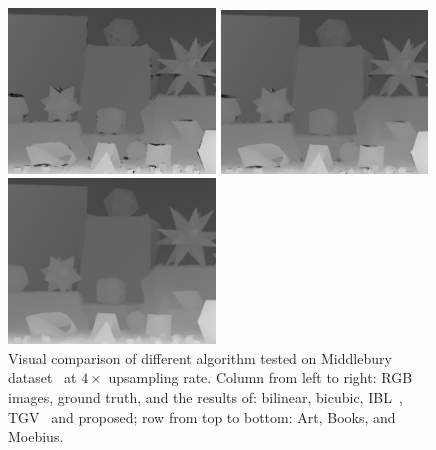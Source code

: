 \begin{figure}[t]
\begin{minipage}[b]{0.48\linewidth}
\end{minipage}
\hfill
\begin{minipage}[b]{0.48\linewidth}
  \centering
  \centerline{\includegraphics[width=5.5cm]{depth_interp/quan_nhf_moebius/yang.png}}
\end{minipage}
%
\hfill
\begin{minipage}[b]{0.48\linewidth}
  \centering
  \centerline{\includegraphics[width=5.5cm]{depth_interp/quan_nhf_moebius/tgv.png}}
\end{minipage}
%
\hfill
\begin{minipage}[b]{0.48\linewidth}
  \centering
  \centerline{\includegraphics[width=5.5cm]{depth_interp/quan_nhf_moebius/our.png}}
\end{minipage}
\vfill
\caption{Visual comparison of different algorithm tested on Middlebury dataset~\cite{scharstein2003high} at $4\times$ upsampling rate. Column from left to right: RGB images, ground truth, and the results of: bilinear, bicubic, IBL~\cite{yang2014color}, TGV~\cite{ferstl2013image} and proposed; row from top to bottom: Art, Books, and Moebius.}
\label{fig:quan_rst}
\end{figure}
